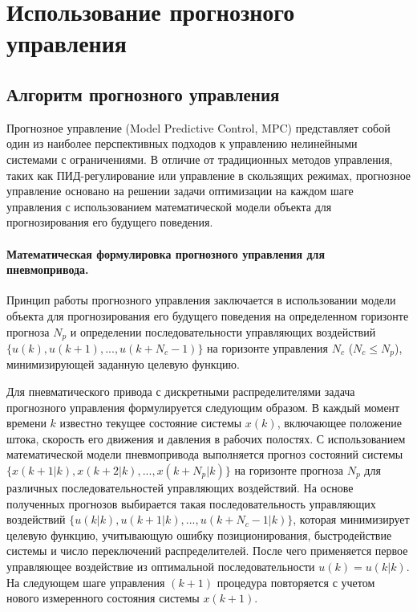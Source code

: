 \section{Использование прогнозного управления}

\subsection*{Алгоритм прогнозного управления}

Прогнозное управление (Model Predictive Control, MPC) представляет собой один из наиболее
перспективных подходов к управлению нелинейными системами с ограничениями. В отличие от
традиционных методов управления, таких как ПИД-регулирование или управление в
скользящих режимах, прогнозное управление основано на решении задачи оптимизации
на каждом шаге управления с использованием математической модели объекта для прогнозирования его будущего поведения.

\paragraph*{Математическая формулировка прогнозного управления для пневмопривода.}

Принцип работы прогнозного управления заключается в использовании модели объекта для
прогнозирования его будущего поведения на определенном горизонте прогноза $N_p$ и определении
последовательности управляющих воздействий $\{u(k), u(k+1), ..., u(k+N_c-1)\}$ на горизонте управления
$N_c$ ($N_c \leq N_p$), минимизирующей заданную целевую функцию.

Для пневматического привода с дискретными распределителями задача прогнозного управления
формулируется следующим образом. В каждый момент времени $k$ известно текущее
состояние системы $x(k)$, включающее положение штока, скорость его движения и давления
в рабочих полостях. С использованием математической модели пневмопривода
выполняется прогноз состояний системы $\{x(k+1|k), x(k+2|k), ..., x(k+N_p|k)\}$ на
горизонте прогноза $N_p$ для различных последовательностей управляющих воздействий. На
основе полученных прогнозов выбирается такая последовательность управляющих
воздействий $\{u(k|k), u(k+1|k), ..., u(k+N_c-1|k)\}$, которая минимизирует целевую
функцию, учитывающую ошибку позиционирования, быстродействие системы и число переключений
распределителей. После чего применяется первое управляющее воздействие из
оптимальной последовательности $u(k) = u(k|k)$. На следующем шаге
управления $(k+1)$ процедура повторяется с учетом нового измеренного состояния системы $x(k+1)$.

